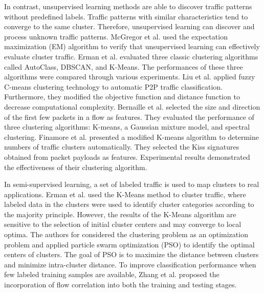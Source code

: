 \documentclass[preprint,12pt]{elsarticle}
\begin{document}
In contrast, unsupervised learning methods are able to discover traffic patterns without predefined labels. Traffic patterns with similar characteristics tend to converge to the same cluster. Therefore, unsupervised learning can discover and process unknown traffic patterns. McGregor et al. \cite{McGregor} used the expectation maximization (EM) algorithm to verify that unsupervised learning can effectively evaluate cluster traffic. 
Erman et al. \cite{ErmanAM06} evaluated three classic clustering algorithms called AutoClass, DBSCAN, and K-Means.
The performances of these three algorithms were compared through various experiments.
Liu et al. \cite{LiuL11b} applied fuzzy C-means clustering technology to automatic P2P traffic classification. Furthermore, they modified the objective function and distance function to decrease computational complexity. Bernaille et al. \cite{BernailleTS06} selected the size and direction of the first few packets in a flow as features. They evaluated the performance of three clustering algorithms: K-means, a Gaussian mixture model, and spectral clustering. Finamore et al.\cite{Finamore} presented a modified K-means algorithm to determine numbers of traffic clusters automatically. They selected the Kiss signatures obtained from packet payloads as features. Experimental results demonstrated the effectiveness of their clustering algorithm.

 
In semi-supervised learning, a set of labeled traffic is used to map clusters to real applications. Erman et al. \cite{Erman:2007} used the K-Means method to cluster traffic, where labeled data in the clusters were used to identify cluster categories according to the majority principle. However, the results of the K-Means algorithm are sensitive to the selection of initial cluster centers and may converge to local optima. The authors for \cite{Liu11} considered the clustering problem as an optimization problem and applied particle swarm optimization (PSO) to identify the optimal centers of clusters. The goal of PSO is to maximize the distance between clusters and minimize intra-cluster distance. To improve classification performance when few labeled training samples are available, Zhang et al. \cite{DBLP:journals/ijsn/ZhangCXZ12} proposed the incorporation of flow correlation into both the training and testing stages.
\end{document}
